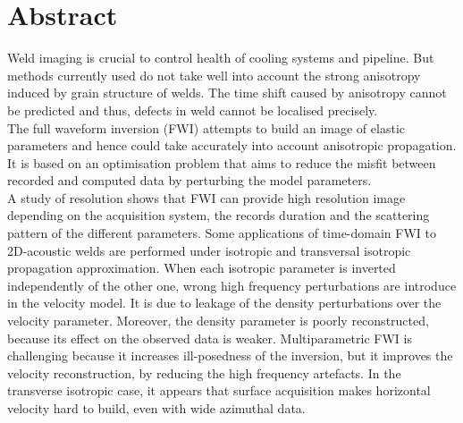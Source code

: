 \section*{Abstract}

Weld imaging is crucial to control health of cooling systems and pipeline. But methods currently used do not take well into account the strong anisotropy induced by grain structure of welds. The time shift caused by anisotropy cannot be predicted and thus, defects in weld cannot be localised precisely. \\

The full waveform inversion (FWI) attempts to build an image of elastic parameters and hence could take accurately into account anisotropic propagation. It is based on an optimisation problem that aims to reduce the misfit between recorded and computed data by perturbing the model parameters. \\

A study of resolution shows that FWI can provide high resolution image depending on the acquisition system, the records duration and the scattering pattern of the different parameters. Some applications of time-domain FWI to 2D-acoustic welds are performed under isotropic and transversal isotropic propagation approximation. When each isotropic parameter is inverted independently of the other one, wrong high frequency perturbations are introduce in the velocity model. It is due to leakage of the density perturbations over the velocity parameter. Moreover, the density parameter is poorly reconstructed, because its effect on the observed data is weaker. Multiparametric FWI is challenging because it increases ill-posedness of the inversion, but it improves the velocity reconstruction, by reducing the high frequency artefacts. In the transverse isotropic case, it appears that surface acquisition makes horizontal velocity hard to build, even with wide azimuthal data. 








